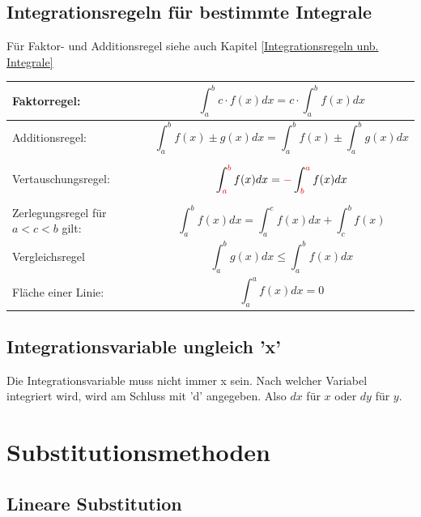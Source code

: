 \documentclass[12pt]{scrartcl}
\newcommand{\red}[1]{\textcolor{red}{#1}}
\begin{document}
\newpage
\subsection{Integrationsregeln für bestimmte Integrale}
Für Faktor- und Additionsregel siehe auch Kapitel \ref{Integrationsregeln unb. Integrale}


\renewcommand{\arraystretch}{1.5}
\begin{center}
    \begin{tabular}{ | m{10em} m{26em} | }
        \hline
        Faktorregel: &  \[\int_a^b c \cdot f(x) dx = c \cdot \int_a^b f(x) dx\]\\ 
        \hline
        Additionsregel: & \[\int_a^b f(x) \pm g(x) dx = \int_a^b f(x) \pm \int_a^b g(x) dx\] \\ 
        \hline
        Vertauschungsregel: & \[\int_{\red{a}}^{\red{b}} f(x) dx = \red{-}\int_{\red{b}}^{\red{a}} f(x) dx\] \\ 
        \hline
        Zerlegungsregel \newline für $a < c < b$ gilt: & \[\int_a^b f(x) dx = \int_a^c f(x) dx + \int_c^b f(x)\] \\ 
        \hline
        Vergleichsregel  & \[\int_a^b g(x) dx \leq \int_a^b f(x) dx\] \\ 
        \hline
        Fläche einer Linie: & \[\int_a^a f(x) dx = 0\] \\ 
        \hline
    \end{tabular}
\end{center}


\subsection{Integrationsvariable ungleich 'x'}
Die Integrationsvariable muss nicht immer x sein. Nach welcher Variabel integriert wird, 
wird am Schluss mit 'd' angegeben. Also $dx$ für $x$ oder $dy$ für $y$.

\newpage
\section{Substitutionsmethoden}
\subsection{Lineare Substitution}
\end{document}
